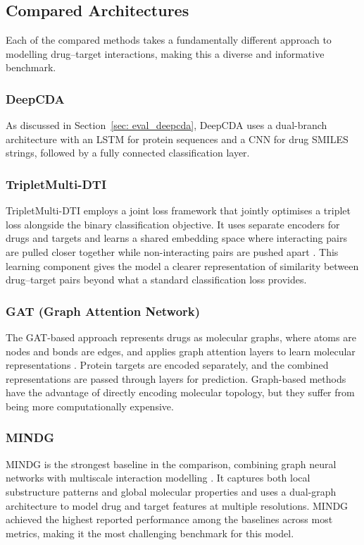 \subsection{Compared Architectures}
\label{subsec:compared-architectures}
Each of the compared methods takes a fundamentally different approach to modelling drug--target interactions, making this a diverse and informative benchmark.

\subsubsection{DeepCDA}
As discussed in Section~\ref{sec: eval_deepcda}, DeepCDA \citep{Abbasi2020} uses a dual-branch architecture with an LSTM for protein sequences and a CNN for drug SMILES strings, followed by a fully connected classification layer.

\subsubsection{TripletMulti-DTI}
TripletMulti-DTI employs a joint loss framework that jointly optimises a triplet loss alongside the binary classification objective.
It uses separate encoders for drugs and targets and learns a shared embedding space where interacting pairs are pulled closer together while non-interacting pairs are pushed apart \citep{DEHGHAN2023120754}.
This learning component gives the model a clearer representation of similarity between drug--target pairs beyond what a standard classification loss provides.

\subsubsection{GAT (Graph Attention Network)}
The GAT-based approach represents drugs as molecular graphs, where atoms are nodes and bonds are edges, and applies graph attention layers to learn molecular representations \citep{wang2021drugtargetinteractionpredictiongraph}.
Protein targets are encoded separately, and the combined representations are passed through layers for prediction.
Graph-based methods have the advantage of directly encoding molecular topology, but they suffer from being more computationally expensive.

\subsubsection{MINDG}
MINDG is the strongest baseline in the comparison, combining graph neural networks with multiscale interaction modelling \citep{Yang2024}.
It captures both local substructure patterns and global molecular properties and uses a dual-graph architecture to model drug and target features at multiple resolutions.
MINDG achieved the highest reported performance among the baselines across most metrics, making it the most challenging benchmark for this model.

